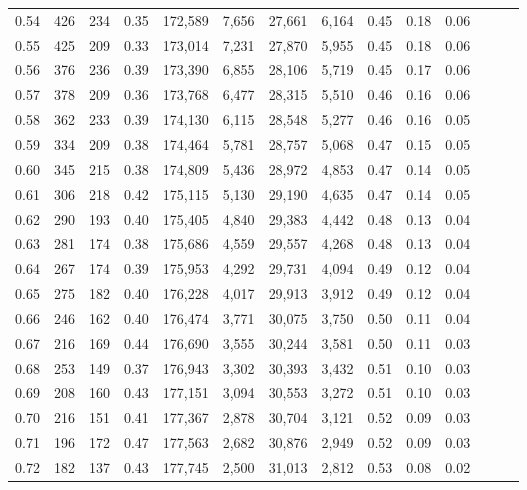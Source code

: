 \begin{tabular}{rrrrrrrrrrrrrr}
0.54 &    426 &  234 &  0.35 &  172,589 &    7,656 &  27,661 &   6,164 &  0.45 &  0.18 &      0.06 \\
0.55 &    425 &  209 &  0.33 &  173,014 &    7,231 &  27,870 &   5,955 &  0.45 &  0.18 &      0.06 \\
0.56 &    376 &  236 &  0.39 &  173,390 &    6,855 &  28,106 &   5,719 &  0.45 &  0.17 &      0.06 \\
0.57 &    378 &  209 &  0.36 &  173,768 &    6,477 &  28,315 &   5,510 &  0.46 &  0.16 &      0.06 \\
0.58 &    362 &  233 &  0.39 &  174,130 &    6,115 &  28,548 &   5,277 &  0.46 &  0.16 &      0.05 \\
0.59 &    334 &  209 &  0.38 &  174,464 &    5,781 &  28,757 &   5,068 &  0.47 &  0.15 &      0.05 \\
0.60 &    345 &  215 &  0.38 &  174,809 &    5,436 &  28,972 &   4,853 &  0.47 &  0.14 &      0.05 \\
0.61 &    306 &  218 &  0.42 &  175,115 &    5,130 &  29,190 &   4,635 &  0.47 &  0.14 &      0.05 \\
0.62 &    290 &  193 &  0.40 &  175,405 &    4,840 &  29,383 &   4,442 &  0.48 &  0.13 &      0.04 \\
0.63 &    281 &  174 &  0.38 &  175,686 &    4,559 &  29,557 &   4,268 &  0.48 &  0.13 &      0.04 \\
0.64 &    267 &  174 &  0.39 &  175,953 &    4,292 &  29,731 &   4,094 &  0.49 &  0.12 &      0.04 \\
0.65 &    275 &  182 &  0.40 &  176,228 &    4,017 &  29,913 &   3,912 &  0.49 &  0.12 &      0.04 \\
0.66 &    246 &  162 &  0.40 &  176,474 &    3,771 &  30,075 &   3,750 &  0.50 &  0.11 &      0.04 \\
0.67 &    216 &  169 &  0.44 &  176,690 &    3,555 &  30,244 &   3,581 &  0.50 &  0.11 &      0.03 \\
0.68 &    253 &  149 &  0.37 &  176,943 &    3,302 &  30,393 &   3,432 &  0.51 &  0.10 &      0.03 \\
0.69 &    208 &  160 &  0.43 &  177,151 &    3,094 &  30,553 &   3,272 &  0.51 &  0.10 &      0.03 \\
0.70 &    216 &  151 &  0.41 &  177,367 &    2,878 &  30,704 &   3,121 &  0.52 &  0.09 &      0.03 \\
0.71 &    196 &  172 &  0.47 &  177,563 &    2,682 &  30,876 &   2,949 &  0.52 &  0.09 &      0.03 \\
0.72 &    182 &  137 &  0.43 &  177,745 &    2,500 &  31,013 &   2,812 &  0.53 &  0.08 &      0.02 \\

\end{tabular}
